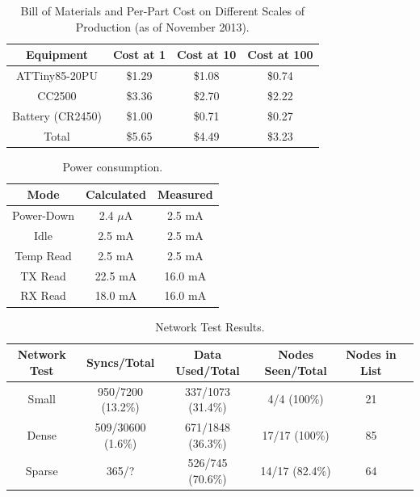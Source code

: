 %
%
\begin{table}%
  \begin{center}
  
  \begin{tabular}{| c | c | c | c |}

  \hline
  \textbf{Equipment} & \textbf{Cost at 1} & \textbf{Cost at 10} & \textbf{Cost at 100} \\
  \hline
  ATTiny85-20PU     & \$1.29 & \$1.08 & \$0.74 \\
  CC2500            & \$3.36 & \$2.70 & \$2.22 \\
  Battery (CR2450)  & \$1.00 & \$0.71 & \$0.27 \\
  Total             & \$5.65 & \$4.49 & \$3.23 \\
  \hline
  
  \end{tabular}  
  \end{center}
  \caption{Bill of Materials and Per-Part Cost on Different Scales of Production (as of November 2013).
  \label{table:bill}
  }
\end{table}

%
%
\begin{table}
  \begin{center}
  
  \begin{tabular}{| c | c | c |}

  \hline
  \textbf{Mode} & \textbf{Calculated} & \textbf{Measured} \\
  \hline
  Power-Down        & 2.4 $\mu$A & 2.5 mA\\
  Idle              & 2.5 mA & 2.5 mA\\
  Temp Read         & 2.5 mA & 2.5 mA \\
  TX Read           & 22.5 mA & 16.0 mA\\
  RX Read           & 18.0 mA &  16.0 mA\\
  \hline
  
  \end{tabular}  
  \end{center}
  \caption{Power consumption.
  \label{table:power_consumption}
  }
\end{table}

%
%
\begin{table}
  
  \begin{tabular}{| c | c | c | c | c | c |}

  \hline
  \textbf{Network Test} & \textbf{Syncs/Total} & \textbf{Data Used/Total} & \textbf{Nodes Seen/Total} & \textbf{Nodes in List}\\
  \hline
  Small        & 950/7200 (13.2\%) & 337/1073 (31.4\%) & 4/4 (100\%) & 21\\
  Dense       & 509/30600 (1.6\%) & 671/1848 (36.3\%) & 17/17 (100\%) & 85\\
  Sparse      & 365/? & 526/745 (70.6\%) & 14/17 (82.4\%) & 64 \\
  \hline
  
  \end{tabular}  
  \caption{Network Test Results.
  \label{table:network_tests}
  }
\end{table}

